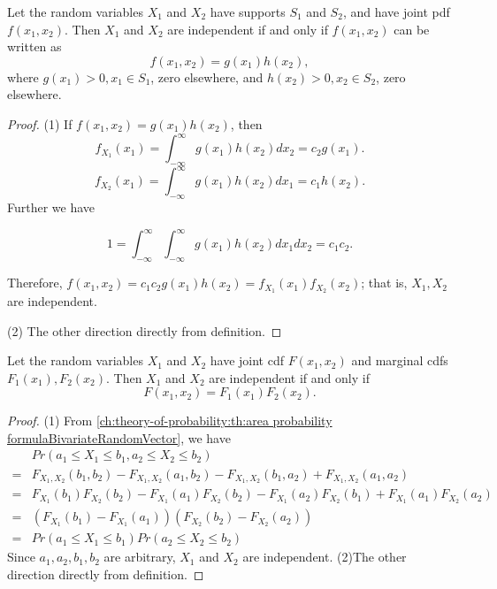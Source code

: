 \begin{refsection}
\begin{lemma}\label{ch:theory-of-probability:th:BivariateRandomVectorIndependenceCondition}\cite[113]{hoggintroduction}
Let the random variables $X_1$ and $X_2$ have supports $S_1$ and $S_2$, and have joint pdf $f(x_1,x_2)$. 
Then $X_1$ and $X_2$ are independent if and only if $f(x_1,x_2)$ can be written as
$$f(x_1,x_2) = g(x_1)h(x_2),$$
where $g(x_1) > 0, x_1\in S_1$, zero elsewhere, and $h(x_2)>0,x_2\in S_2$, zero elsewhere.
\end{lemma}
\begin{proof}
(1) If $f(x_1,x_2) = g(x_1)h(x_2)$, then
$$f_{X_1}(x_1) = \int_{-\infty}^{\infty} g(x_1)h(x_2) dx_2 = c_2 g(x_1).$$
$$f_{X_2}(x_1) = \int_{-\infty}^{\infty} g(x_1)h(x_2) dx_1 = c_1 h(x_2).$$
Further we have

$$1 = \int_{-\infty}^{\infty}\int_{-\infty}^{\infty} g(x_1)h(x_2) dx_1dx_2 = c_1c_2.$$

Therefore, $f(x_1,x_2) = c_1c_2g(x_1)h(x_2) = f_{X_1}(x_1)f_{X_2}(x_2)$; that is, $X_1,X_2$ are independent.

(2) The other direction directly from definition.
\end{proof}


\begin{lemma}\cite[114]{hoggintroduction}
	Let the random variables $X_1$ and $X_2$ have joint cdf $F(x_1,x_2)$ and marginal cdfs $F_1(x_1),F_2(x_2)$.  
	Then $X_1$ and $X_2$ are independent if and only if 
	$$F(x_1,x_2) = F_1(x_1)F_2(x_2).$$
\end{lemma}
\begin{proof}
(1) From \autoref{ch:theory-of-probability:th:area probability formulaBivariateRandomVector}, we have
\begin{align*}
& Pr(a_1\leq X_1\leq b_1, a_2\leq X_2\leq b_2) \\
=& F_{X_1,X_2}(b_1,b_2) -  F_{X_1,X_2}(a_1,b_2) - F_{X_1,X_2}(b_1,a_2)  +F_{X_1,X_2}(a_1,a_2) \\
=& F_{X_1}(b_1)F_{X_2}(b_2) -F_{X_1}(a_1)F_{X_2}(b_2)  -F_{X_1}(a_2)F_{X_2}(b_1)  + F_{X_1}(a_1)F_{X_2}(a_2) \\
=&(F_{X_1}(b_1)-F_{X_1}(a_1))(F_{X_2}(b_2)-F_{X_2}(a_2))\\
=&Pr(a_1\leq X_1\leq b_1) Pr(a_2\leq X_2\leq b_2)
\end{align*}
Since $a_1,a_2,b_1,b_2$ are arbitrary, $X_1$ and $X_2$ are independent.
(2)The other direction directly from definition.
\end{proof}



\end{refsection}
